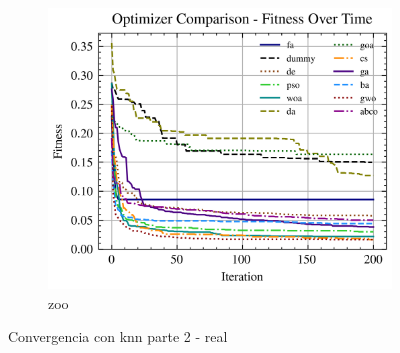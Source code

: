 \begin{figure}[htp]
\begin{subfigure}[htp]{0.45\textwidth}
        \includegraphics[width=\textwidth]{imagenes/fitness_charts/img/real/zoo/optimizers_fitness_knn.png}
        \caption{zoo}
    \end{subfigure}
    \caption{Convergencia con knn parte 2 - real}
    \label{fig:convergencia_knn_2_real}
\end{figure}